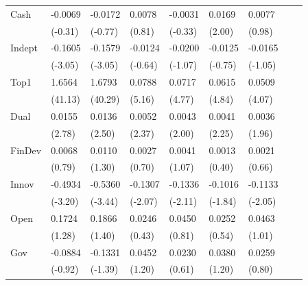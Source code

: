 \begin{table}[htbp]
\begin{tabularx}{\textwidth}{lYYYYYYYY@{}}
Cash            &  -0.0069         &  -0.0172         &   0.0078         &  -0.0031         &   0.0169\sym{**} &   0.0077         \\
                &  (-0.31)         &  (-0.77)         &   (0.81)         &  (-0.33)         &   (2.00)         &   (0.98)         \\
Indept          &  -0.1605\sym{***}&  -0.1579\sym{***}&  -0.0124         &  -0.0200         &  -0.0125         &  -0.0165         \\
                &  (-3.05)         &  (-3.05)         &  (-0.64)         &  (-1.07)         &  (-0.75)         &  (-1.05)         \\
Top1            &   1.6564\sym{***}&   1.6793\sym{***}&   0.0788\sym{***}&   0.0717\sym{***}&   0.0615\sym{***}&   0.0509\sym{***}\\
                &  (41.13)         &  (40.29)         &   (5.16)         &   (4.77)         &   (4.84)         &   (4.07)         \\
Dual            &   0.0155\sym{***}&   0.0136\sym{**} &   0.0052\sym{**} &   0.0043\sym{**} &   0.0041\sym{**} &   0.0036\sym{*}  \\
                &   (2.78)         &   (2.50)         &   (2.37)         &   (2.00)         &   (2.25)         &   (1.96)         \\
FinDev          &   0.0068         &   0.0110         &   0.0027         &   0.0041         &   0.0013         &   0.0021         \\
                &   (0.79)         &   (1.30)         &   (0.70)         &   (1.07)         &   (0.40)         &   (0.66)         \\
Innov           &  -0.4934\sym{***}&  -0.5360\sym{***}&  -0.1307\sym{**} &  -0.1336\sym{**} &  -0.1016\sym{*}  &  -0.1133\sym{**} \\
                &  (-3.20)         &  (-3.44)         &  (-2.07)         &  (-2.11)         &  (-1.84)         &  (-2.05)         \\
Open            &   0.1724         &   0.1866         &   0.0246         &   0.0450         &   0.0252         &   0.0463         \\
                &   (1.28)         &   (1.40)         &   (0.43)         &   (0.81)         &   (0.54)         &   (1.01)         \\
Gov             &  -0.0884         &  -0.1331         &   0.0452         &   0.0230         &   0.0380         &   0.0259         \\
                &  (-0.92)         &  (-1.39)         &   (1.20)         &   (0.61)         &   (1.20)         &   (0.80)         \\

\end{tabularx}
\end{table}
